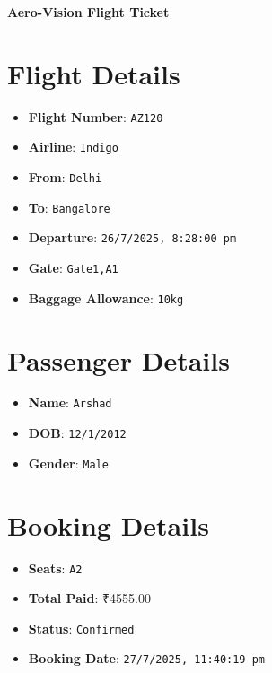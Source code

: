 \documentclass[a4paper,12pt]{article}
\begin{document}
    \begin{center}
      {\LARGE \textbf{Aero-Vision Flight Ticket}} \\
      \vspace{0.5cm}
    \end{center}
    \vspace{0.5cm}
    \section*{Flight Details}
    \begin{itemize}
      \item \textbf{Flight Number}: \texttt{AZ120}
      \item \textbf{Airline}: \texttt{Indigo}
      \item \textbf{From}: \texttt{Delhi}
      \item \textbf{To}: \texttt{Bangalore}
      \item \textbf{Departure}: \texttt{26/7/2025, 8:28:00 pm}
      \item \textbf{Gate}: \texttt{Gate1,A1}
      \item \textbf{Baggage Allowance}: \texttt{10kg}
    \end{itemize}
    \section*{Passenger Details}
    \begin{itemize}
      
        \item \textbf{Name}: \texttt{Arshad}
        \item \textbf{DOB}: \texttt{12/1/2012}
        \item \textbf{Gender}: \texttt{Male}
      
    \end{itemize}
    \section*{Booking Details}
    \begin{itemize}
      \item \textbf{Seats}: \texttt{A2}
      \item \textbf{Total Paid}: ₹4555.00
      \item \textbf{Status}: \texttt{Confirmed}
      \item \textbf{Booking Date}: \texttt{27/7/2025, 11:40:19 pm}
    \end{itemize}
    
\end{document}

